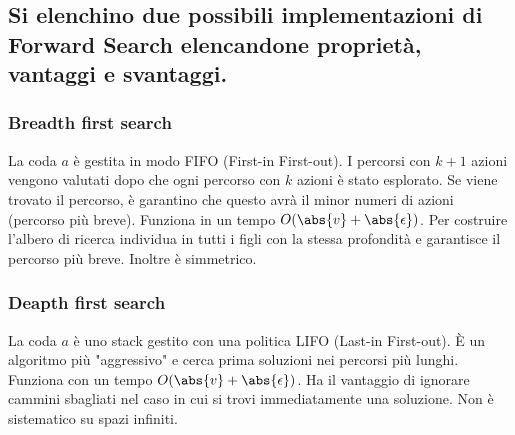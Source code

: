 \documentclass[\main/main.tex]{subfiles}
\begin{document}
%
%            
%

\subsection{Si elenchino due possibili implementazioni di Forward Search elencandone proprietà, vantaggi e svantaggi.}

\subsubsection{Breadth first search}
La coda $a$ è gestita in modo FIFO (First-in First-out). I percorsi con $k+1$ azioni vengono valutati dopo che ogni percorso con $k$ azioni è stato esplorato. Se viene trovato il percorso, è garantino che questo avrà il minor numeri di azioni (percorso più breve). 
Funziona in un tempo $O(\abs{v}+ \abs{\epsilon})$.
Per costruire l'albero di ricerca individua in tutti i figli con la stessa profondità e garantisce il percorso più breve. Inoltre è simmetrico.

\subsubsection{Deapth first search}
La coda $a$ è uno stack gestito con una politica LIFO (Last-in First-out). È un algoritmo più "aggressivo" e cerca prima soluzioni nei percorsi più lunghi.
Funziona con un tempo $O(\abs{v}+ \abs{\epsilon})$.
Ha il vantaggio di ignorare cammini sbagliati nel caso in cui si trovi immediatamente una soluzione.
Non è sistematico su spazi infiniti.
\end{document}
